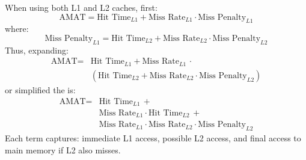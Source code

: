 \noindent
When using both L1 and L2 caches, first:
\begin{equation*}
    \text{AMAT} = \text{Hit Time}_{L1} + \text{Miss Rate}_{L1} \cdot \text{Miss Penalty}_{L1}    
\end{equation*}
where:
\begin{equation*}
    \text{Miss Penalty}_{L1} = \text{Hit Time}_{L2} + \text{Miss Rate}_{L2} \cdot \text{Miss Penalty}_{L2}
\end{equation*}
Thus, expanding:
\begin{equation*}
    \begin{array}{rl}
        \text{AMAT} =& \text{Hit Time}_{L1} + \text{Miss Rate}_{L1}\, \cdot \\ [.5em]
        & (\text{Hit Time}_{L2} + \text{Miss Rate}_{L2} \cdot \text{Miss Penalty}_{L2})
    \end{array}
\end{equation*}
or simplified the  is:
\begin{equation}
    \begin{array}{rl}
        \text{AMAT} =& \text{Hit Time}_{L1}\, + \\ [.5em]
        & \text{Miss Rate}_{L1} \cdot \text{Hit Time}_{L2}\, + \\ [.5em]
        & \text{Miss Rate}_{L1} \cdot \text{Miss Rate}_{L2} \cdot \text{Miss Penalty}_{L2}
    \end{array}
\end{equation}
Each term captures: immediate L1 access, possible L2 access, and final access to main memory if L2 also misses.

